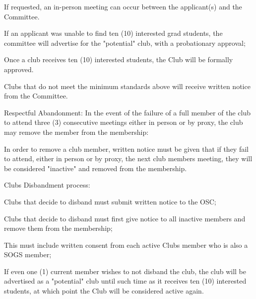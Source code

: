 \begin{longenum}[ label*=\thesubsection.\arabic*., align=left]
\begin{longenum}[label*=\arabic*., align=left]
		\begin{longenum}[label*=\arabic*., align=left]
		\item If requested, an in-person meeting can occur between the applicant(s) and the Committee.
		\end{longenum}
	\item If an applicant was unable to find ten (10) interested grad students, the committee will advertise for the "potential" club, with a probationary approval;
		\begin{longenum}[label*=\arabic*., align=left]
		\item Once a club receives ten (10) interested students, the Club will be formally approved.
		\end{longenum}
	\item Clubs that do not meet the minimum standards above will receive written notice from the Committee.
	\end{longenum}
\item Respectful Abandonment: In the event of the failure of a full member of the club to attend three (3) consecutive meetings either in person or by proxy, the club may remove the member from the membership:
	\begin{longenum}[label*=\arabic*., align=left]
	\item In order to remove a club member, written notice must be given that if they fail to attend, either in person or by proxy, the next club members meeting, they will be considered "inactive" and removed from the membership.
	\end{longenum}
\item Clubs Disbandment process:
	\begin{longenum}[label*=\arabic*., align=left]
	\item Clubs that decide to disband must submit written notice to the OSC;
		\begin{longenum}[label*=\arabic*., align=left]	
		\item Clubs that decide to disband must first give notice to all inactive members and remove them from the membership;
		\item This must include written consent from each active Clubs member who is also a SOGS member;
		\item If even one (1) current member wishes to not disband the club, the club will be advertised as a "potential" club until such time as it receives ten (10) interested students, at which point the Club will be considered active again.		
		\end{longenum}

\end{longenum}
\end{longenum}
